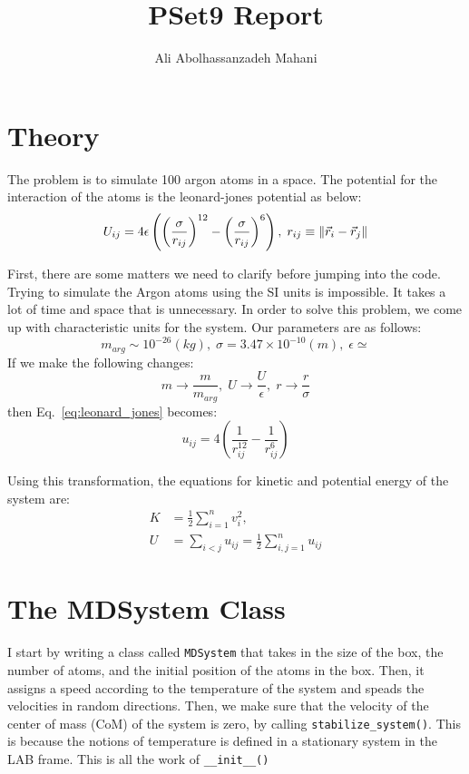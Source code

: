 \documentclass[12pt, a4paper]{article}
\title{PSet9 Report}
\author{Ali Abolhassanzadeh Mahani}
\begin{document}
	\maketitle
	\section{Theory}
	The problem is to simulate 100 argon atoms in a space. The potential for the interaction of 
	the atoms is the leonard-jones potential as below:
	\begin{equation}
		U_{ij} = 4\epsilon \left(\left(\frac{\sigma}{r_{ij}}\right)^{12} - 
		\left(\frac{\sigma}{r_{ij}}\right)^6\right), \; 
		r_{ij} \equiv \norm{\vec{r}_i - \vec{r}_j}
		\label{eq:leonard_jones}
	\end{equation}

	First, there are some matters we need to clarify before jumping into the code.
	Trying to simulate the Argon atoms using the SI units is impossible. It takes a lot of time and
	space that is unnecessary. In order to solve this problem, we come up with characteristic 
	units for the system. Our parameters are as follows:
	\begin{equation}
		m_{arg} \sim 10^{-26} (kg), \; \sigma = 3.47 \times 10^{-10} (m), \; \epsilon \simeq 
	\end{equation}
	If we make the following changes:
	\begin{equation}
		m \rightarrow \frac{m}{m_{arg}}, \; U \rightarrow \frac{U}{\epsilon}, \; r \rightarrow 
		\frac{r}{\sigma}
	\end{equation}
	then Eq.~\ref{eq:leonard_jones} becomes:
	\begin{equation}
		u_{ij} = 4 \left(\frac{1}{r_{ij}^{12}} - \frac{1}{r_{ij}^6}\right)
	\end{equation}
	
	Using this transformation, the equations for kinetic and potential energy of the system 
	are:
	\begin{equation}
		\begin{aligned}
			K &= \frac{1}{2}\sum_{i=1}^{n} v_i^2,\\
			U &= \sum_{i < j} u_{ij} = \frac{1}{2} \sum_{i, j = 1}^{n} u_{ij}
		\end{aligned}
	\end{equation}

	\section{The MDSystem Class}
	I start by writing a class called \texttt{MDSystem} that takes in the size of the box, the
	number of atoms, and the initial position of the atoms in the box. Then, it assigns a speed 
	according to the temperature of the system and speads the velocities in random directions.
	Then, we make sure that the velocity of the center of mass (CoM)  of the system is zero,
	by calling \texttt{stabilize\_system()}. This is because the notions of temperature is defined 
	in a stationary system in the LAB frame. This is all the work of \texttt{\_\_init\_\_()}
	
\end{document}
